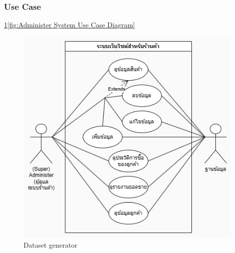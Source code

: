 \subsubsection{Use Case}\ref{fig:Website Application Use Case Diagram}\ref{fig:Administer System Use Case Diagram}

\begin{figure}[h]
  \begin{center}

    \includegraphics[scale=0.5]{pic/diagram/usecase-web.jpg}
  \end{center}

  \caption[Dataset generator]{Dataset generator}
  \label{fig:Website Application Use Case Diagram}
\end{figure}
